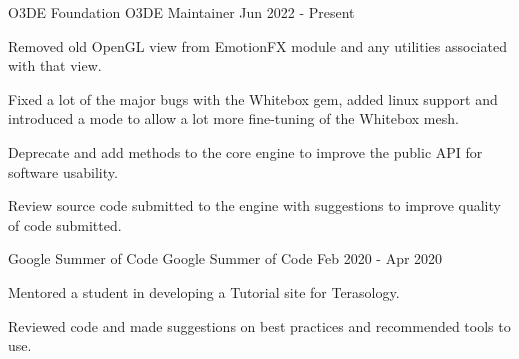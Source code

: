 \begin{cventries}
  \cventry
  {O3DE Foundation} %
  {O3DE Maintainer} %
  {} %
  {Jun 2022 - Present} %
  {
    \begin{cvitems} %
      \item{Removed old OpenGL view from EmotionFX module and any utilities associated with that view.}
      \item{Fixed a lot of the major bugs with the Whitebox gem, added linux support and introduced a mode to allow a lot more fine-tuning of the Whitebox mesh.}
      \item{Deprecate and add methods to the core engine to improve the public API for software usability.}
      \item{Review source code submitted to the engine with suggestions to improve quality of code submitted.}
    \end{cvitems}
  }

    \cventry
    {Google Summer of Code} %
    {Google Summer of Code} %
    {} %
    {Feb 2020 - Apr 2020} %
    {
      \begin{cvitems} %
         \item{Mentored a student in developing a Tutorial site for Terasology.}
         \item{Reviewed code and made suggestions on best practices and recommended tools to use.}
      \end{cvitems}
    }
    


\end{cventries}
